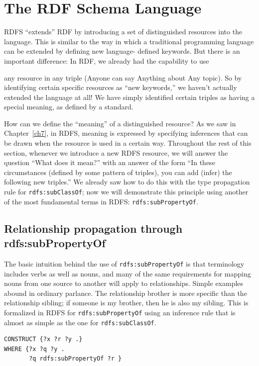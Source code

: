 \section{The RDF Schema Language}

RDFS ``extends'' RDF by introducing a set of distinguished resources
into the language. This is similar to the way in which a traditional
programming language can be extended by defining new language- defined
keywords. But there is an important difference: In RDF, we already had
the capability to use

any resource in any triple (Anyone can say Anything about Any topic). So
by identifying certain specific resources as ``new keywords,'' we
haven't actually extended the language at all! We have simply identified
certain triples as having a special meaning, as defined by a standard.

How can we define the ``meaning'' of a distinguished resource? As we saw
in Chapter~\ref{ch7}, in RDFS, meaning is expressed by specifying inferences
that can be drawn when the resource is used in a certain way. Throughout
the rest of this section, whenever we introduce a new RDFS resource, we
will answer the question ``What does it mean?'' with an answer of the
form ``In these circumstances (defined by some pattern of triples), you
can add (infer) the following new triples.'' We already saw how to do
this with the type propagation rule for \texttt{rdfs:subClassOf}; now we will
demonstrate this principle using another of the most fundamental terms
in RDFS: \texttt{rdfs:subPropertyOf}.

\subsection{Relationship propagation through rdfs:subPropertyOf}

The basic intuition behind the use of \texttt{rdfs:subPropertyOf} is that
terminology includes verbs as well as nouns, and many of the same
requirements for mapping nouns from one source to another will apply to
relationships. Simple examples abound in ordinary parlance. The
relationship brother is more specific than the relationship sibling; if
someone is my brother, then he is also my sibling. This is formalized in
RDFS for \texttt{rdfs:subPropertyOf} using an inference rule that is almost as
simple as the one for \texttt{rdfs:subClassOf}.

\begin{lstlisting}
CONSTRUCT {?x ?r ?y .}
WHERE {?x ?q ?y .
       ?q rdfs:subPropertyOf ?r }
\end{lstlisting}

